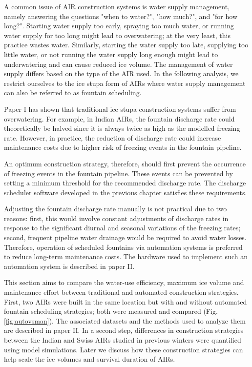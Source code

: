 A common issue of AIR construction systems is water supply management, namely answering the questions "when to
water?", "how much?", and "for how long?". Starting water supply too early, spraying too much water, or
running water supply for too long might lead to overwatering; at the very least, this practice wastes water.
Similarly, starting the water supply too late, supplying too little water, or not running the water supply long
enough might lead to underwatering and can cause reduced ice volume. The management of water supply
differs based on the type of the AIR used. In the following analysis, we restrict ourselves to the ice stupa
form of AIRs where water supply management can also be referred to as fountain scheduling.

Paper I has shown that traditional ice stupa construction systems suffer from overwatering. For example, in
Indian AIRs, the fountain discharge rate could theoretically be halved since it is always twice as high as the
modelled freezing rate. However, in practice, the reduction of discharge rate could increase maintenance costs
due to higher risk of freezing events in the fountain pipeline.

An optimum construction strategy, therefore, should first prevent the occurrence of freezing events in the
fountain pipeline. These events can be prevented by setting a minimum threshold for the recommended discharge
rate. The discharge scheduler software developed in the previous chapter satisfies these requirements.

Adjusting the fountain discharge rate manually is not practical due to two reasons: first, this would involve
constant adjustments of discharge rates in response to the significant diurnal and seasonal variations of the
freezing rates; second, frequent pipeline water drainage would be required to avoid water losses. Therefore, operation
of scheduled fountains via automation systems is preferred to reduce long-term maintenance costs. The
hardware used to implement such an automation system is described in paper II.

This section aims to compare the water-use efficiency, maximum ice volume and maintenance effort between
traditional and automated construction strategies. First, two AIRs were built in the same location but with and
without automated fountain scheduling strategies; both were measured and compared (Fig. \ref{fig:autovsman}).
The associated datasets and the methods used to analyze them are described in paper II. In a second step,
differences in construction strategies between the Indian and Swiss AIRs studied in previous winters were quantified
using model simulations. Later we discuss how these construction strategies can help scale the ice volumes and
survival duration of AIRs. 

